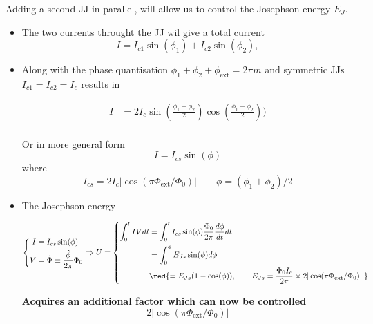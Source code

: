 \noindent
Adding a second JJ in parallel, will allow us to control the Josephson energy $ E_J $.
\begin{itemize}
\item    The   two    currents   throught    the   JJ    wil    give   a    total   current    \begin{equation}   I    =
    I_{c1}\sin(\phi_1)+I_{c2}\sin(\phi_2),
  \end{equation}

\item Along with the phase quantisation $ \phi_1+\phi_2+\phi_\text{ext} = 2\pi m $ and symmetric JJs $I_{c1}=I_{c2}=I_c$
  results in

  \begin{equation}
    \begin{aligned}
      I & = 2I_c\sin(\frac{\phi_1+\phi_2}{2})\cos(\frac{\phi_1-\phi_2}{2})) \\
    \end{aligned}
  \end{equation}

\begin{framed}\noindent
  Or in more general form
  \begin{equation}\label{key}
    I = I_{cs}\sin(\phi)
  \end{equation}
  \noindent where
  \begin{equation}\label{key}
    I_{cs} = 2I_c|\cos(\pi\Phi_\text{ext}/\Phi_0)|\qquad \phi = (\phi_1+\phi_2)/2
  \end{equation}

\end{framed}

\item The Josephson energy

  \begin{equation}
    \left\lbrace\begin{aligned}
        I &= I_{cs}\sin(\phi)\\
        V&=\dot{\Phi} \equiv \frac{\dot{\phi}}{2\pi}\Phi_0
      \end{aligned}\right. \Rightarrow U = \left\lbrace\begin{aligned}
        \int_{0}^{t}IV dt & = \int_{0}^{t}I_{cs}\sin(\phi)\frac{\Phi_0}{2\pi}\frac{d\phi}{dt}dt\\
        & = \int_{0}^{\phi} E_{Js}\sin(\phi)d\phi\\
        & \red{= E_{Js}(1-\cos(\phi)),\qquad E_{Js} = \frac{\Phi_0I_c}{2\pi}\times 2|\cos(\pi\Phi_\text{ext}/\Phi_0)|.}
      \end{aligned}\right.
  \end{equation}
  \begin{framed}\noindent
    \textbf{Acquires an additional factor which can now be controlled
      \begin{equation}\label{key}
        2|\cos(\pi\Phi_\text{ext}/\Phi_0)|
      \end{equation}}
  \end{framed}
\end{itemize}


